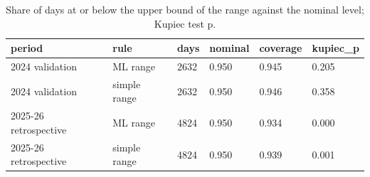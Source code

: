 \begin{table}
\caption{Share of days at or below the upper bound of the range against the nominal level; Kupiec test p.}
\label{tab:r7}
\begin{tabular}{llllll}
\toprule
period & rule & days & nominal & coverage & kupiec\_p \\
\midrule
2024 validation & ML range & 2632 & 0.950 & 0.945 & 0.205 \\
2024 validation & simple range & 2632 & 0.950 & 0.946 & 0.358 \\
2025-26 retrospective & ML range & 4824 & 0.950 & 0.934 & 0.000 \\
2025-26 retrospective & simple range & 4824 & 0.950 & 0.939 & 0.001 \\
\bottomrule
\end{tabular}
\end{table}
